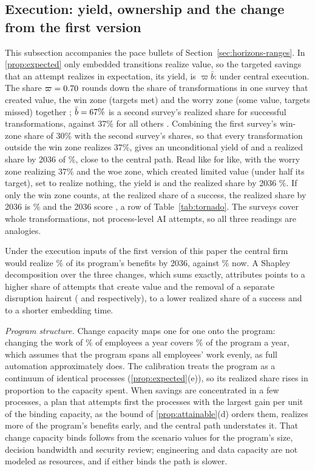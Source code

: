 \subsection{Execution: yield, ownership and the change from the first version}\label{supp:model-execution}
This subsection accompanies the pace bullets of Section~\ref{sec:horizons-ranges}. In \autoref{prop:expected} only embedded transitions realize value, so the targeted savings that an attempt realizes in expectation, its yield, is $\varpi\bar b$: \YieldModel{} under central execution. The share $\varpi=0.70$ rounds down the share of transformations in one survey that created value, the win zone (targets met) and the worry zone (some value, targets missed) together \citep{bcg2020flipping}; $\bar b=67\%$ is a second survey's realized share for successful transformations, against 37\% for all others \citep{mckinsey2021losing}. Combining the first survey's win-zone share of 30\% with the second survey's shares, so that every transformation outside the win zone realizes 37\%, gives an unconditional yield of \YieldMck{} and a realized share by 2036 of \ShareMck\%, close to the central path. Read like for like, with the worry zone realizing 37\% and the woe zone, which created limited value (under half its target), set to realize nothing, the yield is \YieldExec{} and the realized share by 2036 \ShareExec\%. If only the win zone counts, at the realized share of a success, the realized share by 2036 is \ShareBcgWin\% and the 2036 score \ScoreBcgWin, a row of Table~\ref{tab:tornado}. The surveys cover whole transformations, not process-level AI attempts, so all three readings are analogies.

Under the execution inputs of the first version of this paper the central firm would realize \BridgeOld\% of its program's benefits by 2036, against \BridgeNew\% now. A Shapley decomposition over the three changes, which sums exactly, attributes \BridgeSucc{} points to a higher share of attempts that create value and the removal of a separate disruption haircut (\BridgeVarpi{} and \BridgeHaircut{} respectively), \BridgeBbar{} to a lower realized share of a success and \BridgeTemb{} to a shorter embedding time.

\emph{Program structure.} Change capacity maps one for one onto the program: changing the work of \PaceCapCen\% of employees a year covers \PaceCapCen\% of the program a year, which assumes that the program spans all employees' work evenly, as full automation approximately does. The calibration treats the program as a continuum of identical processes (\autoref{prop:expected}(e)), so its realized share rises in proportion to the capacity spent. When savings are concentrated in a few processes, a plan that attempts first the processes with the largest gain per unit of the binding capacity, as the bound of \autoref{prop:attainable}(d) orders them, realizes more of the program's benefits early, and the central path understates it. That change capacity binds follows from the scenario values for the program's size, decision bandwidth and security review; engineering and data capacity are not modeled as resources, and if either binds the path is slower.

